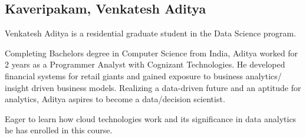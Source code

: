 \subsection{Kaveripakam, Venkatesh Aditya}
Venkatesh Aditya is a residential graduate student in the Data Science program.

Completing Bachelors degree in Computer Science from India, Aditya worked for 2
years as a Programmer Analyst with Cognizant Technologies. He developed
financial systems for retail giants and gained exposure to business analytics/
insight driven business models. Realizing a data-driven future and an aptitude
for analytics, Aditya aspires to become a data/decision scientist.

Eager to learn how cloud technologies work and its significance in data
analytics he has enrolled in this course.
